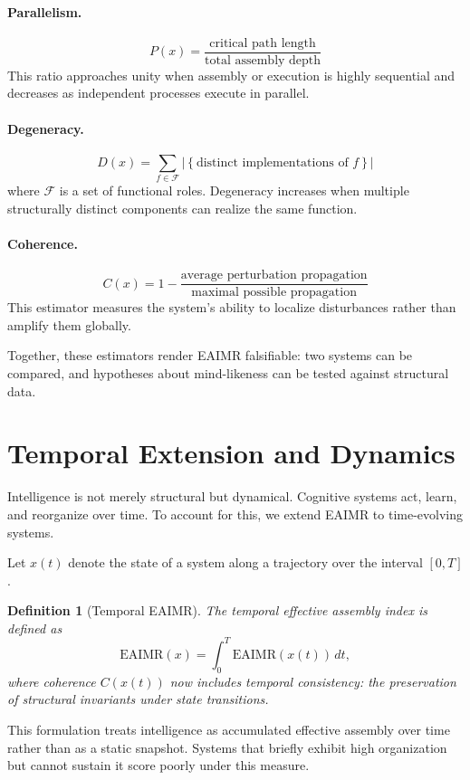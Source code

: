 \documentclass[11pt,letterpaper]{article}
\newtheorem{definition}{Definition}
\begin{document}
\paragraph{Parallelism.}
\[
P(x) = \frac{\text{critical path length}}{\text{total assembly depth}}
\]
This ratio approaches unity when assembly or execution is highly sequential and decreases as independent processes execute in parallel.

\paragraph{Degeneracy.}
\[
D(x) = \sum_{f \in \mathcal{F}} \left| \left\{ \text{distinct implementations of } f \right\} \right|
\]
where $\mathcal{F}$ is a set of functional roles. Degeneracy increases when multiple structurally distinct components can realize the same function.

\paragraph{Coherence.}
\[
C(x) = 1 - \frac{\text{average perturbation propagation}}{\text{maximal possible propagation}}
\]
This estimator measures the system’s ability to localize disturbances rather than amplify them globally.

Together, these estimators render EAIMR falsifiable: two systems can be compared, and hypotheses about mind-likeness can be tested against structural data.

\section{Temporal Extension and Dynamics}

Intelligence is not merely structural but dynamical. Cognitive systems act, learn, and reorganize over time. To account for this, we extend EAIMR to time-evolving systems.

Let $x(t)$ denote the state of a system along a trajectory over the interval $[0,T]$.

\begin{definition}[Temporal EAIMR]
The temporal effective assembly index is defined as
\[
\mathrm{EAIMR}(x)
=
\int_0^T \mathrm{EAIMR}(x(t)) \, dt,
\]
where coherence $C(x(t))$ now includes temporal consistency: the preservation of structural invariants under state transitions.
\end{definition}

This formulation treats intelligence as accumulated effective assembly over time rather than as a static snapshot. Systems that briefly exhibit high organization but cannot sustain it score poorly under this measure.
\end{document}
